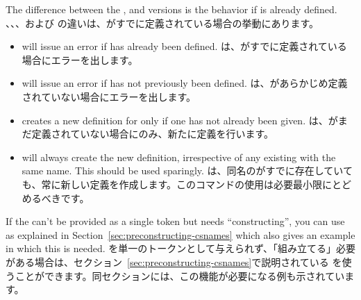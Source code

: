 \documentclass{ltxguide}
\newcommand\jpnewline{\vspace{3pt}\newline}
\DeclareRobustCommand{\jpquote}[1]{「#1」}
\begin{document}
The difference between the  , 
and  versions is the behavior if  is already
defined.
\jpnewline
{}、、、および の違いは、がすでに定義されている場合の挙動にあります。
\begin{itemize}
 \item {} will issue an error if 
   has already been defined.
\jpnewline   
{}は、がすでに定義されている場合にエラーを出します。 
 \item {} will issue an error if 
   has not previously been defined.
  \jpnewline 
 は、があらかじめ定義されていない場合にエラーを出します。
 \item {} creates a new definition for
    only if one has not already been given.
 \jpnewline  
 は、がまだ定義されていない場合にのみ、新たに定義を行います。
 \item {} will always create the new
   definition, irrespective of any existing  with the
   same name.  This should be used sparingly.
 \jpnewline  
{}は、同名のがすでに存在していても、常に新しい定義を作成します。このコマンドの使用は必要最小限にとどめるべきです。
\end{itemize}

If the  can't be provided as a single token but needs
\enquote{constructing}, you can use  as explained in
Section~\ref{sec:preconstructing-csnames} which also gives an example
in which this is needed.
\jpnewline
{}を単一のトークンとして与えられず、\jpquote{組み立てる}必要がある場合は、セクション~\ref{sec:preconstructing-csnames}で説明されている を使うことができます。同セクションには、この機能が必要になる例も示されています。
\end{document}
